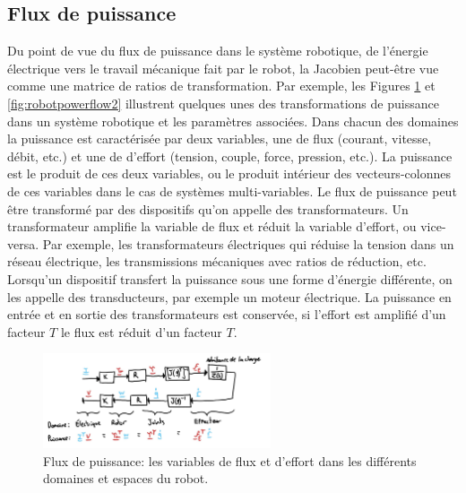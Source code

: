 \subsection{Flux de puissance}

Du point de vue du flux de puissance dans le système robotique, de l'énergie électrique vers le travail mécanique fait par le robot, la Jacobien peut-être vue comme une matrice de ratios de transformation. Par exemple, les Figures \ref{fig:robotpowerflow1} et \ref{fig:robotpowerflow2} illustrent quelques unes des transformations de puissance dans un système robotique et les paramètres associées. Dans chacun des domaines la puissance est caractérisée par deux variables, une de flux (courant, vitesse, débit, etc.) et une de d'effort (tension, couple, force, pression, etc.). La puissance est le produit de ces deux variables, ou le produit intérieur des vecteurs-colonnes de ces variables dans le cas de systèmes multi-variables. Le flux de puissance peut être transformé par des dispositifs qu'on appelle des transformateurs. Un transformateur amplifie la variable de flux et réduit la variable d'effort, ou vice-versa. Par exemple, les transformateurs électriques qui réduise la tension dans un réseau électrique, les transmissions mécaniques avec ratios de réduction, etc. Lorsqu'un dispositif transfert la puissance sous une forme d'énergie différente, on les appelle des transducteurs, par exemple un moteur électrique. La puissance en entrée et en sortie des transformateurs est conservée, si l'effort est amplifié d'un facteur $T$ le flux est réduit d'un facteur $T$. 


\begin{figure}[htpb]
	\centering
		\includegraphics[width=0.60\textwidth]{fig/robotpowerflow1.jpg}
	\caption{Flux de puissance: les variables de flux et d'effort dans les différents domaines et espaces du robot.}
	\label{fig:robotpowerflow1}
\end{figure}

